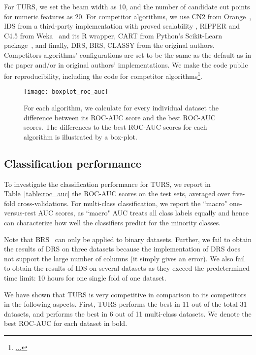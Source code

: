  For TURS, we set the beam width as 10, and the number of candidate cut points for numeric features as 20. For competitor algorithms, we use CN2 from Orange~\citep{JMLR:demsar13a}, IDS from a third-party implementation with proved scalability \citep{filip2019pyids}, RIPPER and C4.5 from Weka~\citep{hall2009weka} and its R wrapper, CART from Python's Scikit-Learn package~\citep{scikit-learn}, and finally, DRS, BRS, CLASSY from the original authors. Competitors algorithms' configurations are set to be the same as the default as in the paper and/or in original authors' implementations. We make the code public for reproducibility, including the code for competitor algorithms\footnote{\url{...}}.




\begin{figure}[ht]
\texttt{[image: boxplot\_roc\_auc]}	
\caption{For each algorithm, we calculate for every individual dataset the difference between its ROC-AUC score and the best ROC-AUC scores. The differences to the best ROC-AUC scores for each algorithm is illustrated by a box-plot.} \label{fig:diff_to_best_auc}
\end{figure}

\subsection{Classification performance} \label{subsec:classifier_perf}
To investigate the classification performance for TURS, we report  in Table~\ref{table:roc_auc} the ROC-AUC scores on the test sets, averaged over five-fold cross-validations. For multi-class classification, we report the ``macro" one-versus-rest AUC scores, as ``macro" AUC treats all class labels equally and hence can characterize how well the classifiers predict for the minority classes. 

Note that BRS~\citep{wang2017bayesian} can only be applied to binary datasets. Further, we fail to obtain the results of DRS on three datasets because the implementation of DRS does not support the large number of columns (it simply gives an error). We also fail to obtain the results of IDS on several datasets as they exceed the predetermined time limit: 10 hours for one single fold of one dataset. 

We have shown that TURS is very competitive in comparison to its competitors in the following aspects. First, TURS performs the best in 11 out of the total 31 datasets, and performs the best in 6 out of 11 multi-class datasets. We denote the best ROC-AUC for each dataset in bold. 

